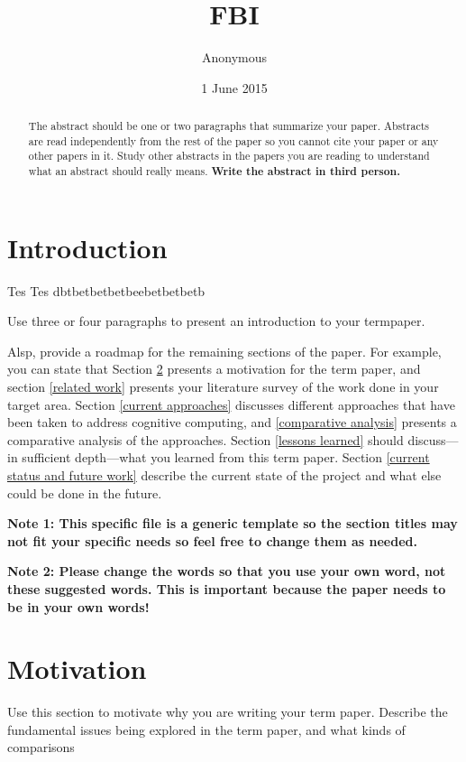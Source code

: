 \documentclass{sig-alternate}
\begin{document}
\title{FBI}
\author{
\alignauthor
Anonymous
}
\date{1 June 2015}
\maketitle
\begin{abstract}
  The abstract should be one or two paragraphs that
  summarize your paper. Abstracts are read independently
  from the rest of the paper so you cannot cite your paper
  or any other papers in it. Study other abstracts in the papers
  you are reading to understand what an abstract should
  really means. {\bf Write the abstract in third person.}
\end{abstract}

\section{Introduction}
\label{introduction}

Tes Tes dbtbetbetbetbeebetbetbetb

Use three or four paragraphs to present an introduction to your termpaper.

Alsp, provide a roadmap for the remaining sections of the paper. For
example, you can state that Section \ref{motivation} presents a
motivation for the term paper, and section \ref{related work} presents your
literature survey of the work done in your target area. Section
\ref{current approaches} discusses different approaches that have been
taken to address cognitive computing, and \ref{comparative analysis}
presents a comparative analysis of the approaches. Section
\ref{lessons learned} should discuss---in sufficient depth---what you
learned from this term paper.  Section \ref{current status and future
  work} describe the current state of the project and what else
could be done in the future.

{\bf Note 1: This specific file is a generic template so the
  section titles may not fit your specific needs so feel
  free to change them as needed.}

{\bf Note 2: Please change the words so that you use your own word,
  not these suggested words. This is important because the paper needs
  to be in your own words!}

\section{Motivation}
\label{motivation}

Use this section to motivate why you are writing your term paper. Describe the
fundamental issues being explored in the term paper, and what kinds of
comparisons
\end{document}
